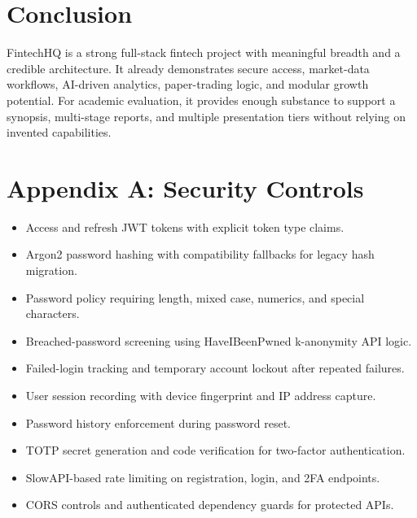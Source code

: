 \documentclass[11pt,a4paper]{article}
\begin{document}
\section{Conclusion}
FintechHQ is a strong full-stack fintech project with meaningful breadth and a credible architecture. It already demonstrates secure access, market-data workflows, AI-driven analytics, paper-trading logic, and modular growth potential. For academic evaluation, it provides enough substance to support a synopsis, multi-stage reports, and multiple presentation tiers without relying on invented capabilities.
\section*{Appendix A: Security Controls}
\begin{itemize}
\item Access and refresh JWT tokens with explicit token type claims.
\item Argon2 password hashing with compatibility fallbacks for legacy hash migration.
\item Password policy requiring length, mixed case, numerics, and special characters.
\item Breached-password screening using HaveIBeenPwned k-anonymity API logic.
\item Failed-login tracking and temporary account lockout after repeated failures.
\item User session recording with device fingerprint and IP address capture.
\item Password history enforcement during password reset.
\item TOTP secret generation and code verification for two-factor authentication.
\item SlowAPI-based rate limiting on registration, login, and 2FA endpoints.
\item CORS controls and authenticated dependency guards for protected APIs.
\end{itemize}
\end{document}
